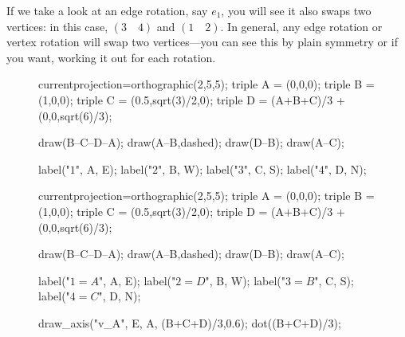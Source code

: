 \documentclass[../key.tex]{subfiles}
\begin{document}
If we take a look at an edge rotation, say $e_1$, you will see it also swaps two vertices: in this case, $(3\quad 4)$ and $(1\quad 2)$. In general, any edge rotation or vertex rotation will swap two vertices---you can see this by plain symmetry or if you want, working it out for each rotation.

\begin{figure}[h]
	\begin{center}
		\begin{minipage}[b]{0.45\textwidth}
			\centering
			\begin{asy}[width=0.5\textwidth]
			currentprojection=orthographic(2,5,5);
			triple A = (0,0,0);
			triple B = (1,0,0);
			triple C = (0.5,sqrt(3)/2,0);
			triple D = (A+B+C)/3 + (0,0,sqrt(6)/3);
			
			draw(B--C--D--A);
			draw(A--B,dashed);
			draw(D--B);
			draw(A--C);
			
			label("$1$", A, E);
			label("$2$", B, W);
			label("$3$", C, S);
			label("$4$", D, N);
			
			\end{asy}
		\end{minipage}
		\hfill
		\begin{minipage}[b]{0.45\textwidth}
			\begin{asy}[width=0.7\textwidth]
			currentprojection=orthographic(2,5,5);
			triple A = (0,0,0);
			triple B = (1,0,0);
			triple C = (0.5,sqrt(3)/2,0);
			triple D = (A+B+C)/3 + (0,0,sqrt(6)/3);
			
			draw(B--C--D--A);
			draw(A--B,dashed);
			draw(D--B);
			draw(A--C);
			
			label("$1=A$", A, E);
			label("$2=D$", B, W);
			label("$3=B$", C, S);
			label("$4=C$", D, N);
			
			draw_axis("v_A", E, A, (B+C+D)/3,0.6);
			dot((B+C+D)/3);
			\end{asy}
		\end{minipage}
	\end{center}
	\vspace*{-2\baselineskip}
	\begin{center}
		\begin{minipage}[t]{0.45\textwidth}
			\label{fig:tetra_indices}
		\end{minipage}
		\hfill
		\begin{minipage}[t]{0.45\textwidth}
			\label{fig:v_a_repr}
		\end{minipage}
	\end{center}
	\vspace*{-2\baselineskip}
\end{figure}
\end{document}
